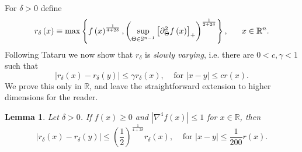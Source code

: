 \documentclass{amsart}
\theoremstyle{plain}
\newtheorem{lemma}[theorem]{Lemma}
\numberwithin{equation}{section}
\begin{document}
For $\delta >0$ define%
\begin{equation*}
r_{\delta }\left( x\right) \equiv \max \left\{ f\left( x\right) ^{\frac{1}{%
4+2\delta }},\left( \sup_{\Theta \in \mathbb{S}^{n-1}}\left[ \partial
_{\Theta }^{2}f\left( x\right) \right] _{+}\right) ^{\frac{1}{2+2\delta }%
}\right\} ,\ \ \ \ \ x\in \mathbb{R}^{n}.
\end{equation*}%
Following Tataru \cite{Tat} we now show that $r_{\delta }$ is \emph{slowly
varying}, i.e. there are $0<c,\gamma <1$ such that%
\begin{equation*}
\left\vert r_{\delta }\left( x\right) -r_{\delta }\left( y\right)
\right\vert \leq \gamma r_{\delta }\left( x\right) ,\ \ \ \ \ \text{for }%
\left\vert x-y\right\vert \leq cr\left( x\right) .
\end{equation*}%
We prove this only in $\mathbb{R}$, and leave the straightforward extension
to higher dimensions for the reader.

\begin{lemma}
\label{second}Let $\delta >0$. If $f\left( x\right) \geq 0$ and $\left\vert
\nabla ^{4}f\left( x\right) \right\vert \leq 1$ for $x\in \mathbb{R}$, then%
\begin{equation*}
\left\vert r_{\delta }\left( x\right) -r_{\delta }\left( y\right)
\right\vert \leq \left( \frac{1}{2}\right) ^{\frac{1}{4+2\delta }}r_{\delta
}\left( x\right) ,\ \ \ \ \ \text{for }\left\vert x-y\right\vert \leq \frac{1%
}{200}r\left( x\right) .
\end{equation*}
\end{lemma}
\end{document}
